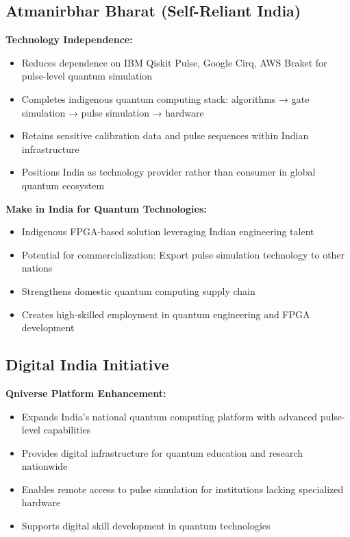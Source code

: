 \documentclass[12pt,a4paper]{article}
\begin{document}
\subsection{Atmanirbhar Bharat (Self-Reliant India)}

\textbf{Technology Independence:}
\begin{itemize}[noitemsep]
\item Reduces dependence on IBM Qiskit Pulse, Google Cirq, AWS Braket for pulse-level quantum simulation
\item Completes indigenous quantum computing stack: algorithms → gate simulation → pulse simulation → hardware
\item Retains sensitive calibration data and pulse sequences within Indian infrastructure
\item Positions India as technology provider rather than consumer in global quantum ecosystem
\end{itemize}

\textbf{Make in India for Quantum Technologies:}
\begin{itemize}[noitemsep]
\item Indigenous FPGA-based solution leveraging Indian engineering talent
\item Potential for commercialization: Export pulse simulation technology to other nations
\item Strengthens domestic quantum computing supply chain
\item Creates high-skilled employment in quantum engineering and FPGA development
\end{itemize}

\subsection{Digital India Initiative}

\textbf{Qniverse Platform Enhancement:}
\begin{itemize}[noitemsep]
\item Expands India's national quantum computing platform with advanced pulse-level capabilities
\item Provides digital infrastructure for quantum education and research nationwide
\item Enables remote access to pulse simulation for institutions lacking specialized hardware
\item Supports digital skill development in quantum technologies
\end{itemize}
\end{document}
